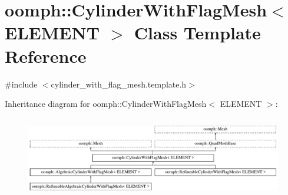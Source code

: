 \hypertarget{classoomph_1_1CylinderWithFlagMesh}{}\section{oomph\+:\+:Cylinder\+With\+Flag\+Mesh$<$ E\+L\+E\+M\+E\+NT $>$ Class Template Reference}
\label{classoomph_1_1CylinderWithFlagMesh}


{\ttfamily \#include $<$cylinder\+\_\+with\+\_\+flag\+\_\+mesh.\+template.\+h$>$}

Inheritance diagram for oomph\+:\+:Cylinder\+With\+Flag\+Mesh$<$ E\+L\+E\+M\+E\+NT $>$\+:\begin{figure}[H]
\begin{center}
\leavevmode
\includegraphics[height=3.608248cm]{classoomph_1_1CylinderWithFlagMesh}
\end{center}
\end{figure}
